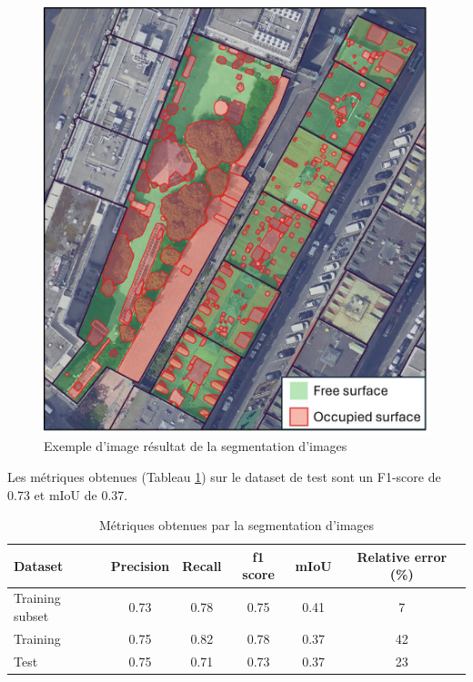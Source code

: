 \begin{figure}[H]
    \centering
    \includegraphics[width=1\linewidth]{02-main//figures/ch2/stdl_09_segmentation_image_resultats.png}
    \caption{Exemple d’image résultat de la segmentation d’images \cite{herny_detection_2024}}
    \label{fig:stdl_09_segmentation_image_resultats}
\end{figure}
\newpage
\par{Les métriques obtenues (Tableau \ref{tab:stdl_06_segmentation_image_resultats}) sur le dataset de test sont un F1-score de 0.73 et mIoU de 0.37.}
\begin{table}[H]
    \centering
    \begin{tabular}{|l|c|c|c|c|c|}
    \hline
    Dataset & Precision & Recall & f1 score & mIoU & Relative error (\%) \\
    \hline
    Training subset & 0.73 & 0.78 & 0.75 & 0.41 & 7 \\
    Training & 0.75 & 0.82 & 0.78 & 0.37 & 42 \\
    Test & 0.75 & 0.71 & 0.73 & 0.37 & 23 \\
    \hline
    \end{tabular}
    \caption{Métriques obtenues par la segmentation d'images}
    \label{tab:stdl_06_segmentation_image_resultats}
\end{table}
